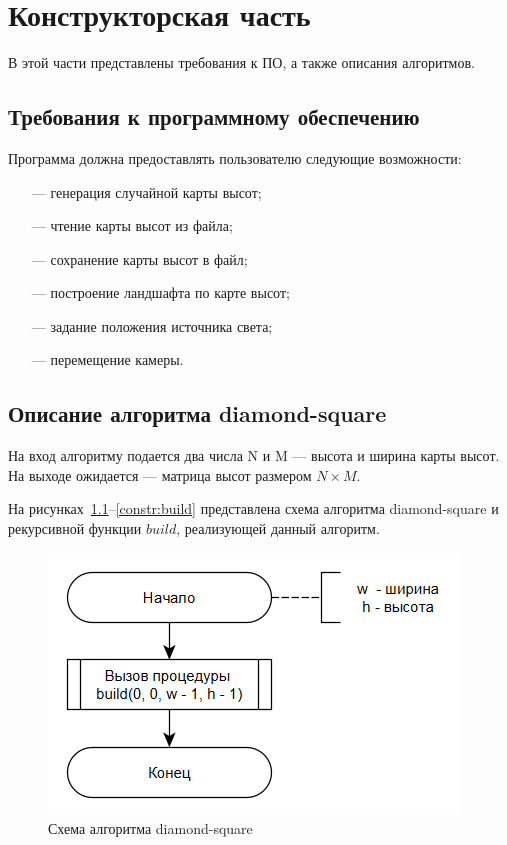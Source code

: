 \documentclass[a4paper, 14pt]{extreport}
\begin{document}
\chapter{Конструкторская часть}

В этой части представлены требования к ПО, а также описания алгоритмов.

\section{Требования к программному обеспечению}

Программа должна предоставлять пользователю следующие возможности:
\begin{itemize}
	\item[---] генерация случайной карты высот;
	\item[---] чтение карты высот из файла;
	\item[---] сохранение карты высот в файл;
	\item[---] построение ландшафта по карте высот;
	\item[---] задание положения источника света;
	\item[---] перемещение камеры.
\end{itemize}

\section{Описание алгоритма diamond-square}

На вход алгоритму подается два числа N и M --- высота и ширина карты высот. На выходе ожидается  --- матрица 
высот размером $N \times M$. 

На рисунках~\ref{constr:ds}--\ref{constr:build} представлена схема алгоритма diamond-square и рекурсивной функции $build$, 
реализующей данный алгоритм.

\begin{figure}[h]
	\centering
	\includegraphics[scale=0.9]{tools/alg_ds.png}
	\caption{Схема алгоритма diamond-square}
	\label{constr:ds}
\end{figure}
\end{document}

